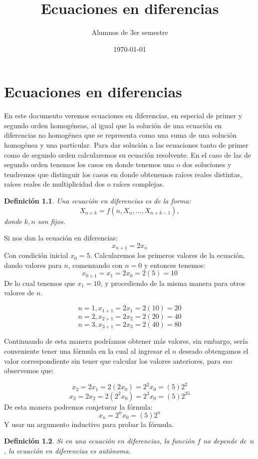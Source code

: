 \documentclass{report}
\title{Ecuaciones en diferencias}
\author{Alumnos de 3er semestre}
\date{\today}
\newtheorem{definicion}{Definición}[chapter]
\begin{document}
\maketitle
\tableofcontents

\chapter{Ecuaciones en diferencias}
\label{sec:ecuaciones}

En este documento veremos ecuaciones en diferencias, en especial de
primer y segundo orden homogéneas, al igual que la solución de una
ecuación en diferencias no homogénea que se representa como una suma
de una solución homogénea y una particular. Para dar solución a las
ecuaciones tanto de primer como de segundo orden calcularemos su
ecuación resolvente.
En el caso de las de segundo orden tenemos los casos en donde tenemos una o dos soluciones y tendremos que distinguir los casos en donde obtenemos raíces reales distintas, raíces reales de multiplicidad dos o raíces complejas.

\begin{definicion}
Una ecuación en diferencias es de la forma:
$$X_{n+k}=f(n,X_n,...,X_{n+k-1}),$$
donde $k,n$ son fijos.
\end{definicion}

\begin{Ejemplo}


Si nos dan la ecuación en diferencias:
$$x_{n+1}=2x_n$$
Con condición inicial  $x_0=5$. Calcularemos los primeros valores de la ecuación, dando valores para $n$, comenzando con $n=0$ y entonces tenemos:
$$x_{0+1}=x_1=2x_0=2(5)=10$$
De lo cual tenemos que $x_1=10$, y procediendo de la misma manera para otros valores de $n$.

 $$ n=1,  x_{1+1}=2x_1=2(10)=20$$
 $$ n=2,  x_{2+1}=2x_2=2(20)=40$$
 $$ n=3,  x_{3+1}=2x_3=2(40)=80$$

 Continuando de esta manera podríamos obtener más valores, sin embargo, sería conveniente
 tener una fórmula en la cual al ingresar el $n$ deseado obtengamos el valor correspondiente
 sin tener que calcular los valores anteriores, para eso observemos que:

 $$x_2=2x_1=2(2x_0)=2^2x_0=(5)2^2$$
 $$x_3=2x_2=2(2^2x_0)=2^3x_0=(5)2^35$$
 De esta manera podremos conjeturar la fórmula:
 $$x_n=2^nx_0=(5)2^n$$
 Y usar un argumento inductivo para probar la fórmula.
 \end{Ejemplo}

\begin{definicion}
Si en una ecuación en diferencias, la función $f$ no depende de~$n$,
la ecuación en diferencias es \emph{autónoma}.
\end{definicion}
\end{document}

